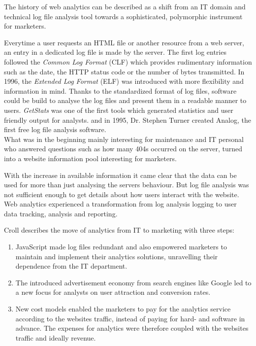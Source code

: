 The history of web analytics can be described as a shift from an IT domain and technical log file analysis tool towards a sophisticated, polymorphic instrument for marketers.


Everytime a user requests an HTML file or another resource from a web server, an entry in a dedicated log file is made by the server. %
The first log entries followed the \textit{Common Log Format} (CLF) which provides rudimentary information such as the date, the HTTP status code or the number of bytes transmitted.
In 1996, the \textit{Extended Log Format} (ELF) was introduced with more flexibility and information in mind.
Thanks to the standardized format of log files, software could be build to analyse the log files and present them in a readable manner to users.
\textit{GetStats} was one of the first tools which generated statistics and user friendly output for analysts.
and in 1995, Dr. Stephen Turner created Analog, the first free log file analysis software.%
\\

What was in the beginning mainly interesting for maintenance and IT personal who answered questions such as how many 404s occurred on the server, turned into a website information pool interesting for marketers.

With the increase in available information it came clear that the data can be used for more than just analysing the servers behaviour.
But log file analysis was not sufficient enough to get details about how users interact with the website.
Web analytics experienced a transformation from log analysis logging to user data tracking, analysis and reporting.

Croll describes the move of analytics from IT to marketing with three steps: %
\begin{enumerate}
\item JavaScript made log files redundant and also empowered marketers to maintain and implement their analytics solutions, unravelling their dependence from the IT department.
\item The introduced advertisement economy from search engines like Google led to a new focus for analysts on user attraction and conversion rates.
\item New cost models enabled the marketers to pay for the analytics service according to the websites traffic, instead of paying for hard- and software in advance. The expenses for analytics were therefore coupled with the websites traffic and ideally revenue.
\end{enumerate}


